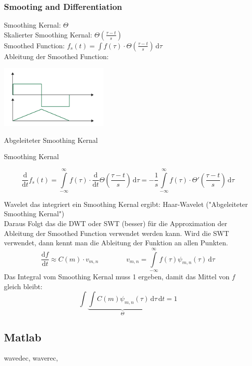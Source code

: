 \subsubsection{Smooting and Differentiation}
\begin{minipage}[r]{0.5\textwidth}
Smoothing Kernal: $\Theta$\\
Skalierter Smoothing Kernal: $\Theta(\frac{\tau - t}{s})$\\
Smoothed Function: $f_s(t) = \int f(\tau) \cdot \Theta(\frac{\tau - t}{s}) \, \mathrm{d}\tau$\\
Ableitung der Smoothed Function: 
\end{minipage}
\begin{minipage}[r]{0.5\textwidth}
	\includegraphics[width=0.4\textwidth]{content/SmoothingFunction.pdf}
	
	\vspace{-2.2cm}
	
	\flushright
	Abgeleiteter Smoothing Kernal
	
	\vspace{.4cm}
	
	Smoothing Kernal	
\end{minipage}

\[ \frac{\mathrm{d}}{\mathrm{d}t}f_s(t) = \int\limits_{-\infty}^{\infty} f(\tau) \cdot \frac{\mathrm{d}}{\mathrm{d}t}\Theta(\frac{\tau - t}{s}) \, \mathrm{d}\tau = -\frac{1}{s} \int\limits_{-\infty}^{\infty} f(\tau) \cdot \Theta'(\frac{\tau - t}{s}) \, \mathrm{d}\tau \]

Wavelet das integriert ein Smoothing Kernal ergibt: Haar-Wavelet ("Abgeleiteter Smoothing Kernal")\\
Daraus Folgt das die DWT oder SWT (besser) für die Approximation der Ableitung der Smoothed Function verwendet werden kann. Wird die SWT verwendet, dann kennt man die Ableitung der Funktion an allen Punkten.
\[ 
	\frac{\mathrm{d}f}{\mathrm{d}t} \approx C(m) \cdot v_{m,n}
	\qquad \qquad
	v_{m,n} =  \int\limits_{-\infty}^{\infty} f(\tau) \psi_{m,n}(\tau) \, \mathrm{d}\tau 
\]
Das Integral vom Smoothing Kernal muss 1 ergeben, damit das Mittel von $f$ gleich bleibt: 
\[ \int \underbrace{\int C(m) \psi_{m,n}(\tau) \,\mathrm{d}\tau}_{\Theta} \,\mathrm{d}t = 1 \]



\subsection{Matlab}
wavedec, waverec, 



